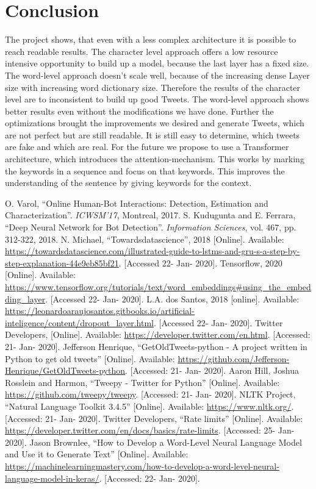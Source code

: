 \documentclass[conference]{IEEEtran}
\begin{document}
\section{Conclusion}

The project shows, that even with a less complex architecture it is possible to reach readable results. The character level approach offers a low resource intensive opportunity to
build up a model, because the last layer has a fixed size. The word-level approach doesn’t scale well, because of the increasing dense Layer size with increasing word dictionary size. Therefore the results of the character level are to inconsistent to build up good Tweets. The word-level approach shows better results even without the modifications we have done. Further the optimizations brought the improvements we desired and generate Tweets, which are not perfect but are still readable. It is still easy to determine, which tweets are fake and which are real. For the future we propose to use a Transformer architecture, which introduces the attention-mechanism. This works by marking the keywords in a sequence and focus on that keywords. This improves the understanding of the sentence by giving keywords for the context.


\begin{thebibliography}{00}
 O. Varol, ``Online Human-Bot Interactions: Detection, Estimation and Characterization''. \textit{ICWSM'17}, Montreal, 2017.
 S. Kudugunta and E. Ferrara, ``Deep Neural Network for Bot Detection''. \textit{Information Sciences}, vol. 467, pp. 312-322, 2018.
 N. Michael, ``Towardsdatascience'', 2018 [Online]. Available: \url{https://towardsdatascience.com/illustrated-guide-to-lstms-and-gru-s-a-step-by-step-explanation-44e9eb85bf21}. [Accessed 22- Jan- 2020].
 Tensorflow, 2020 [Online]. Available: \url{https://www.tensorflow.org/tutorials/text/word_embeddings#using_the_embedding_layer}. [Accessed 22- Jan- 2020].
 L.A. dos Santos, 2018 [online]. Available: \url{https://leonardoaraujosantos.gitbooks.io/artificial-inteligence/content/dropout_layer.html}. [Accessed 22- Jan- 2020].
 Twitter Developers, [Online]. Available: \url{https://developer.twitter.com/en.html}. [Accessed: 21- Jan- 2020].
 Jefferson Henrique, ``GetOldTweets-python - A project written in Python to get old tweets'' [Online]. Available: \url{https://github.com/Jefferson-Henrique/GetOldTweets-python}. [Accessed: 21- Jan- 2020].
 Aaron Hill, Joshua Rosslein and Harmon, ``Tweepy - Twitter for Python'' [Online]. Available: \url{https://github.com/tweepy/tweepy}. [Accessed: 21- Jan- 2020].
 NLTK Project, ``Natural Language Toolkit 3.4.5'' [Online]. Available: \url{https://www.nltk.org/}. [Accessed: 21- Jan- 2020].
 Twitter Developers, ``Rate limits'' [Online]. Available: \url{https://developer.twitter.com/en/docs/basics/rate-limits}. [Accessed: 25- Jan- 2020].
 Jason Brownlee, ``How to Develop a Word-Level Neural Language Model and Use it to Generate Text'' [Online]. Available: \url{https://machinelearningmastery.com/how-to-develop-a-word-level-neural-language-model-in-keras/}. [Accessed: 22- Jan- 2020].
\end{thebibliography}
\end{document}

